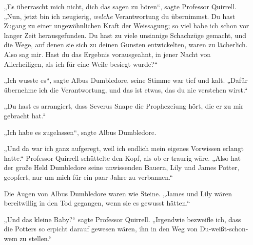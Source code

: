 „Es überrascht mich nicht, dich das sagen zu hören“, sagte Professor Quirrell. „Nun, jetzt bin ich neugierig, \emph{welche} Verantwortung du übernimmst. Du hast Zugang zu einer ungewöhnlichen Kraft der Weissagung; so viel habe ich schon vor langer Zeit herausgefunden. Du hast zu viele unsinnige Schachzüge gemacht, und die Wege, auf denen sie sich zu deinen Gunsten entwickelten, waren zu lächerlich. Also sag mir. Hast du das Ergebnis vorausgeahnt, in jener Nacht von Allerheiligen, als ich für eine Weile besiegt wurde?“

„Ich wusste es“, sagte Albus Dumbledore, seine Stimme war tief und kalt. „Dafür übernehme ich die Verantwortung, und das ist etwas, das du nie verstehen wirst.“

„Du hast es arrangiert, dass Severus Snape die Prophezeiung hört, die er zu mir gebracht hat.“

„Ich habe es zugelassen“, sagte Albus Dumbledore.

„Und da war ich ganz aufgeregt, weil ich endlich mein eigenes Vorwissen erlangt hatte.“ Professor Quirrell schüttelte den Kopf, als ob er traurig wäre. „Also hat der große Held Dumbledore seine unwissenden Bauern, Lily und James Potter, geopfert, nur um mich für ein paar Jahre zu verbannen.“

Die Augen von Albus Dumbledore waren wie Steine.
„James und Lily wären bereitwillig in den Tod gegangen, wenn sie es gewusst hätten.“

„Und das kleine Baby?“ sagte Professor Quirrell. „Irgendwie bezweifle ich, dass die Potters so erpicht darauf gewesen wären, ihn in den Weg von Du-weißt-schon-wem zu stellen.“

